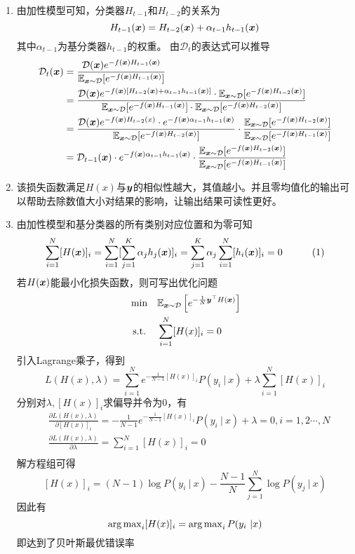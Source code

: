\documentclass[answers]{exam}  %
\begin{document}
\begin{questions}
\begin{solution}
    \begin{enumerate}
		\item 由加性模型可知，分类器$H_{t-1}$和$H_{t-2}$的关系为
		\[
			H_{t-1}({\boldsymbol{x}})=H_{t-2}({\boldsymbol{x}})+\alpha_{t-1}h_{t-1}({\boldsymbol{x}})	
		\]
		其中$\alpha_{t-1}$为基分类器$h_{t-1}$的权重。
		由$\mathcal{D}_{t}$的表达式可以推导
		\[
			\begin{aligned}
				\mathcal{D}_t({\boldsymbol{x}})
				&=\frac{\mathcal{D}({\boldsymbol{x}})e^{-f({\boldsymbol{x}})H_{t-1}({\boldsymbol{x}})}}{\mathbb{E}_{{\boldsymbol{x}}\sim\mathcal D}[e^{-f({\boldsymbol{x}})H_{t-1}({\boldsymbol{x}})}]}\\
				&=\frac{\mathcal{D}({\boldsymbol{x}})e^{-f({\boldsymbol{x}})[H_{t-2}({\boldsymbol{x}})+\alpha_{t-1}h_{t-1}({\boldsymbol{x}})]}\cdot\mathbb{E}_{{\boldsymbol{x}}\sim\mathcal D}[e^{-f({\boldsymbol{x}})H_{t-2}({\boldsymbol{x}})}]}{\mathbb{E}_{{\boldsymbol{x}}\sim\mathcal D}[e^{-f({\boldsymbol{x}})H_{t-1}({\boldsymbol{x}})}]\cdot\mathbb{E}_{{\boldsymbol{x}}\sim\mathcal D}[e^{-f({\boldsymbol{x}})H_{t-2}({\boldsymbol{x}})}]}\\
				&=\frac{\mathcal D({\boldsymbol{x}})e^{-f({\boldsymbol{x}})H_{t-2}(x)}\cdot e^{-f({\boldsymbol{x}})\alpha_{t-1}h_{t-1}({\boldsymbol{x}})}}{\mathbb{E}_{{\boldsymbol{x}}\sim\mathcal D}[e^{-f({\boldsymbol{x}})H_{t-2}({\boldsymbol{x}})}]}\cdot\frac{\mathbb{E}_{{\boldsymbol{x}}\sim\mathcal D}[e^{-f({\boldsymbol{x}})H_{t-2}({\boldsymbol{x}})}]}{\mathbb{E}_{{\boldsymbol{x}}\sim\mathcal D}[e^{-f({\boldsymbol{x}})H_{t-1}({\boldsymbol{x}})}]}\\
				&=\mathcal{D}_{t-1}({\boldsymbol{x}})\cdot e^{-f({\boldsymbol{x}})\alpha_{t-1}h_{t-1}({\boldsymbol{x}})}\cdot\frac{\mathbb{E}_{{\boldsymbol{x}}\sim\mathcal D}[e^{-f({\boldsymbol{x}})H_{t-2}({\boldsymbol{x}})}]}{\mathbb{E}_{{\boldsymbol{x}}\sim\mathcal D}[e^{-f({\boldsymbol{x}})H_{t-1}({\boldsymbol{x}})}]}
			\end{aligned}	
		\]
		\item 该损失函数满足$H(x)$与$\boldsymbol{y}$的相似性越大，其值越小。并且零均值化的输出可以帮助去除数值大小对结果的影响，让输出结果可读性更好。
		\item 由加性模型和基分类器的所有类别对应位置和为零可知
		\[\sum^N_{i=1}[H({\boldsymbol{x}})]_i=\sum^N_{i=1}[\sum^K_{j=1}\alpha_jh_j({\boldsymbol{x}})]_i=\sum^K_{j=1}\alpha_j\sum^N_{i=1}[h_i({\boldsymbol{x}})]_i=0\quad\quad\quad\text{(1)} \]
		若$H({\boldsymbol{x}})$能最小化损失函数，则可写出优化问题
		\[
			\begin{aligned}
				&\min &&\mathbb E_{{\boldsymbol{x}}\sim \mathcal D}\left[ e^{-\frac1N\boldsymbol{y}^\top H({\boldsymbol{x}})} \right]	\\
				&\text{ s.t.}&&\sum^N_{i=1}[H(x)]_i=0
			\end{aligned}
		\]
		引入Lagrange乘子，得到
		\[L(H(x), \lambda)=\sum^N_{i=1}e^{-\frac1{N-1} [H(x)]_i}P(y_i\ |\ x)+\lambda\sum^N_{i=1}[H(x)]_i  \]
		分别对$\lambda,[H(x)]_i$求偏导并令为0，有
		\[
			\begin{aligned}
				&\frac{\partial L(H(x),\lambda)}{\partial [H(x)]_i}=-\frac1{N-1}e^{-\frac1{N-1} [H(x)]_i}P(y_i\ |\ x)+\lambda=0,i=1,2\cdots,N\\
				&\frac{\partial L(H(x),\lambda)}{\partial \lambda}=\sum^N_{i=1}[H(x)]_i=0\\
			\end{aligned}	
		\]
		解方程组可得
		\[
			[H(x)]_i=(N-1)\log P(y_i\ |\ x)-\frac{N-1}{N}\sum^N_{j=1}\log P(y_j\ |\ x)
		\]
		因此有
		\[
			\operatorname{arg\,max}\limits_{i} [H(x)]_i=\operatorname{arg\,max}_{i} P(y_i\ | x)	
		\]
		即达到了贝叶斯最优错误率
	\end{enumerate}
\end{solution}


\end{questions}
\end{document}
